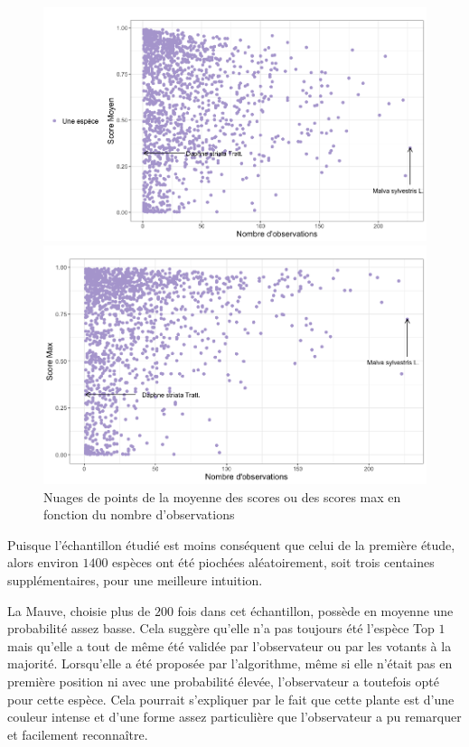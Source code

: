 \documentclass[a4paper,12pt]{article}
\begin{document}
\begin{figure}[H]
    \centering
    \begin{minipage}{0.5\textwidth}
      \includegraphics[width=0.9\linewidth]{images/mean_rd_users.png}
    \end{minipage}%
    \begin{minipage}{0.5\textwidth}
      \includegraphics[width=0.9\linewidth]{images/max_rd_users.png}
    \end{minipage}
    \caption{Nuages de points de la moyenne des scores ou des scores max en fonction du nombre d'observations}
\end{figure}


Puisque l'échantillon étudié est moins conséquent que celui de la première étude, alors environ $\num{1400}$ espèces ont été piochées aléatoirement, soit trois centaines supplémentaires, pour une meilleure intuition. 

\vspace{0.2cm}

La Mauve, choisie plus de $200$ fois dans cet échantillon, possède en moyenne une probabilité assez basse. Cela suggère qu'elle n'a pas toujours été l'espèce Top $1$ mais qu'elle a tout de même été validée par l'observateur ou par les votants à la majorité. Lorsqu'elle a été proposée par l'algorithme, même si elle n'était pas en première position ni avec une probabilité élevée, l'observateur a toutefois opté pour cette espèce. Cela pourrait s'expliquer par le fait que cette plante est d'une couleur intense et d'une forme assez particulière que l'observateur a pu remarquer et facilement reconnaître.
\end{document}
